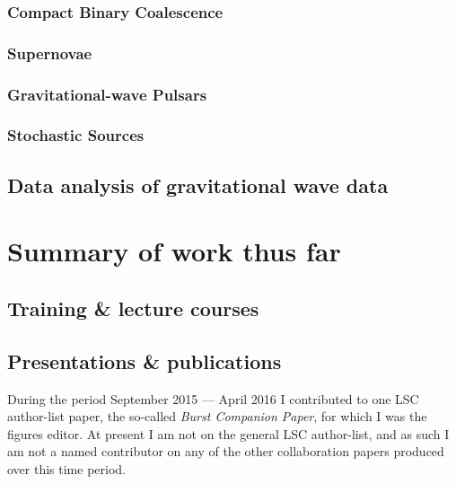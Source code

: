 \documentclass{kentigern}
\begin{document}
\section{Compact Binary Coalescence}
\label{sec:cbc}


\section{Supernovae}
\label{sec:sn}


\section{Gravitational-wave Pulsars}
\label{sec:pulsar}


\section{Stochastic Sources}
\label{sec:stochastic-sources}


\chapter{Data analysis of gravitational wave data}
\label{cha:data-analys-grav}


\part{Summary of work thus far}
\label{part:work}

\chapter{Training \& lecture courses}
\label{chap:lectures}

\chapter{Presentations \& publications}
\label{chap:pandp}

During the period September 2015 --- April 2016 I contributed to one
LSC author-list paper, the so-called \emph{Burst Companion Paper}, for
which I was the figures editor. At present I am not on the general LSC
author-list, and as such I am not a named contributor on any of the
other collaboration papers produced over this time period.
\end{document}
